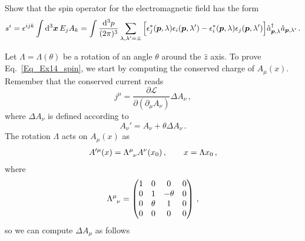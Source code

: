 \begin{ex} \label{ex_14} 
    Show that the spin operator for the electromagnetic field has the form
    \begin{equation}
        s^{i} = \epsilon^{ijk}\int {\rm d}^3 \boldsymbol{x} \, E_{j}A_{k} = \int \frac{{\rm d}^3p}{(2\pi)^{3}} \sum_{\lambda ,\lambda'=\pm}\Big[\epsilon^*_{j}(\boldsymbol{p},\lambda)\epsilon_{i}(\boldsymbol{p}, \lambda') - \epsilon^*_{i}(\boldsymbol{p},\lambda)\epsilon_{j}(\boldsymbol{p}, \lambda')\Big]\hat{a}^\dagger_{\boldsymbol{p},\lambda}\hat{a}_{\boldsymbol{p}, \lambda'} \, .
        \label{Eq_Ex14_spin}
    \end{equation}
\end{ex}


\begin{sol}
    Let $\Lambda = \Lambda(\theta)$ be a rotation of an angle $\theta$ around the $\hat{z}$ axis. To prove Eq.~\eqref{Eq_Ex14_spin}, we start by computing the conserved charge of $A_{\mu}(x)$. Remember that the conserved current reads
    \begin{equation}
    \label{jmu}
            j^{\mu} = \frac{\partial \mathcal{L}}{\partial(\partial_{\mu}A_{\nu})} \Delta A_{\nu} \,,
    \end{equation}
    where $\Delta A_\nu$ is defined according to
    \begin{equation}
            A_\nu' = A_\nu + \theta \Delta A_{\nu}\,.
    \end{equation}
    The rotation $\Lambda$ acts on $A_\mu(x)$ as 
    \begin{equation}
    \begin{split}
        A'^{\mu}(x) = \tensor{\Lambda}{^\mu_\nu} A^{\nu}(x_{0}) \,, 
        \qquad 
        x = \Lambda x_{0} \,,
        \end{split}
    \end{equation}
    where
    \begin{equation}
        \tensor{\Lambda}{^\mu_\nu} = \begin{pmatrix}
            1 & 0 & 0 & 0 \\
            0 & 1 & -\theta & 0 \\
            0 & \theta & 1 & 0 \\
            0 & 0 & 0 & 0 \\
        \end{pmatrix} \,,
    \end{equation}
    so we can compute $\Delta A_{\mu}$ as follows

\end{sol}
